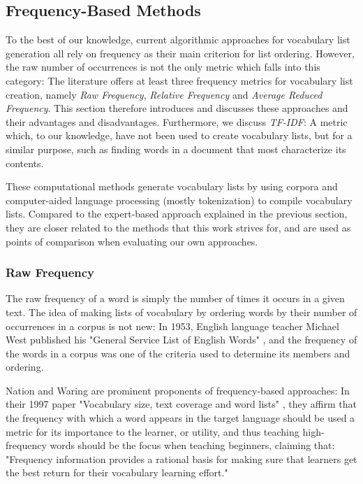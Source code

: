\subsection{Frequency-Based Methods} \label{sec:frequency-based-list-generation-methods}
To the best of our knowledge, current algorithmic approaches for vocabulary list generation all rely on frequency as their main criterion for list ordering.
However, the raw number of occurrences is not the only metric which falls into this category:
The literature offers at least three frequency metrics for vocabulary list creation, namely \textit{Raw Frequency}, \textit{Relative Frequency} and \textit{Average Reduced Frequency}.
This section therefore introduces and discusses these approaches and their advantages and disadvantages.
Furthermore, we discuss \textit{TF-IDF}:
A metric which, to our knowledge, have not been used to create vocabulary lists, but for a similar purpose, such as finding words in a document that most characterize its contents.

These computational methods generate vocabulary lists by using corpora and computer-aided language processing (mostly tokenization) to compile vocabulary lists.
Compared to the expert-based approach explained in the previous section, they are closer related to the methods that this work strives for, and are used as points of comparison when evaluating our own approaches.

\subsubsection {Raw Frequency}
The raw frequency of a word is simply the number of times it occurs in a given text.
The idea of making lists of vocabulary by ordering words by their number of occurrences in a corpus is not new:
In 1953, English language teacher Michael West published his "General Service List of English Words" \cite{michaelwestGeneralServiceList1953}, and the frequency of the words in a corpus was one of the criteria used to determine its members and ordering.

Nation and Waring are prominent proponents of frequency-based approaches:
In their 1997 paper "Vocabulary size, text coverage and word lists" \cite{nationVocabularySizeText1997}, they affirm that the frequency with which a word appears in the target language should be used a metric for its importance to the learner, or utility, and thus teaching high-frequency words should be the focus when teaching beginners, claiming that:
"Frequency information provides a rational basis for making sure that learners get the best return for their vocabulary learning effort."

